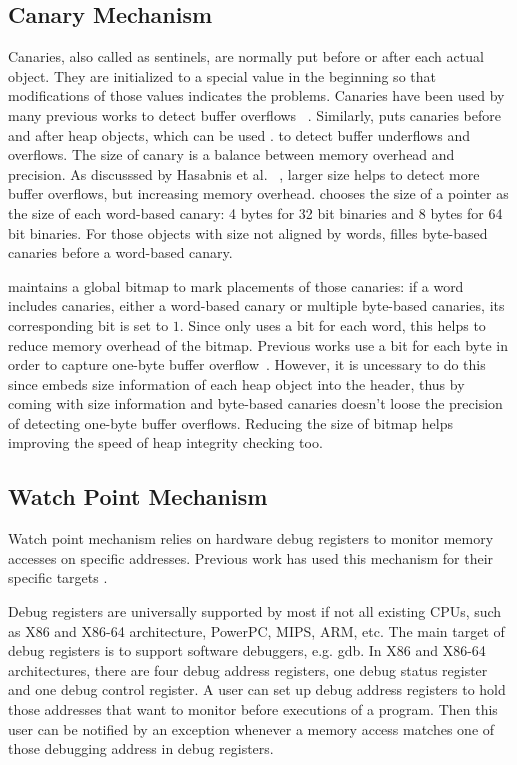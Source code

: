 \subsection{Canary Mechanism}
\label{sec:canaries}
Canaries, also called as sentinels, are normally put before or after each actual object.
They are initialized to a special value in the beginning so that modifications of those values
indicates the problems.
Canaries have been used by many previous works to
detect buffer overflows ~\cite{overflow:purify, exterminator, overflow:lbc}.
Similarly, \stopgap{} puts canaries before and after heap objects, which can be used .
to detect buffer underflows and overflows.
The size of canary is a balance between memory overhead and precision.
As discusssed by Hasabnis et al. ~\cite{overflow:lbc}, larger size helps to detect more
buffer overflows, but increasing memory overhead.
\stopgap{} chooses the size of a pointer as the size of each word-based canary:
4 bytes for 32 bit binaries and 8 bytes for 64 bit binaries.
For those objects with size not aligned by words, \stopgap{} filles byte-based canaries before a
word-based canary.

\stopgap{} maintains a global bitmap to mark placements of those canaries:
if a word includes canaries, either a word-based canary or multiple
byte-based canaries, its corresponding bit is set to $1$.
Since \stopgap{} only uses a bit for each word, this helps to reduce memory overhead of the bitmap.
Previous works use a bit for each byte in order to capture one-byte buffer overflow~\cite{overflow:lbc, AddressSanitizer}.
However, it is uncessary to do this since \stopgap{} embeds size information of each heap object
into the header, thus by coming with size information and byte-based canaries \stopgap{} doesn't
loose the precision of detecting one-byte buffer overflows.
Reducing the size of bitmap helps improving the speed of heap integrity checking too.

\subsection{Watch Point Mechanism}
\label{sec:watchpoints}
Watch point mechanism relies on hardware debug registers to monitor memory accesses on
specific addresses. Previous work has used this mechanism for their specific 
targets \cite{fastboundschecking, Kivati}.

Debug registers are universally supported by most if not all existing CPUs, such as
X86 and X86-64 architecture, PowerPC, MIPS, ARM, etc. 
The main target of debug registers is to support software debuggers, e.g. gdb. 
In X86 and X86-64 architectures, there are four debug address registers, one debug 
status register and one debug control register. 
A user can set up debug address registers to hold those addresses that want to monitor 
before executions of a program. 
Then this user can be notified by an exception whenever a memory access matches one of those 
debugging address in debug registers. 

